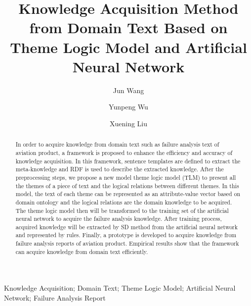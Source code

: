 \documentclass{elsarticle}
\begin{document}
\begin{frontmatter}


\title{Knowledge Acquisition Method from Domain Text Based on Theme Logic Model and Artificial Neural Network }


\author[buaa]{Jun Wang}
\author[buaa]{Yunpeng Wu}
\author[buaa]{Xuening Liu}





\address[buaa]{School of Economics \& Management, Beihang University, Beijing 100083,
P.R. China }


\begin{abstract}
In order to acquire knowledge from domain text such as failure
analysis text of aviation product, a framework is proposed to enhance
the efficiency and accuracy of knowledge acquisition. In this
framework, sentence templates are defined to extract the
meta-knowledge and RDF is used to describe the extracted knowledge.
After the preprocessing steps, we propose a new model theme logic
model (TLM) to present all the themes of a piece of text and the logical
relations between different themes. In this model, the text of each
theme can be represented as an attribute-value vector based on domain
ontology and the logical relations are the domain knowledge to be
acquired. The theme logic model then will be transformed to the
training set of the artificial neural network to acquire the failure
analysis knowledge. After training process,  acquired knowledge will be extracted by SD method from the artificial neural network and represented by rules. Finally, a prototype is developed to acquire knowledge from failure analysis reports of aviation product. Empirical results show that the framework can acquire knowledge from domain text efficiently.
\end{abstract}

\begin{keyword}


Knowledge Acquisition; Domain Text; Theme Logic Model; Artificial Neural Network; Failure Analysis Report


\end{keyword}

\end{frontmatter}
\end{document}
